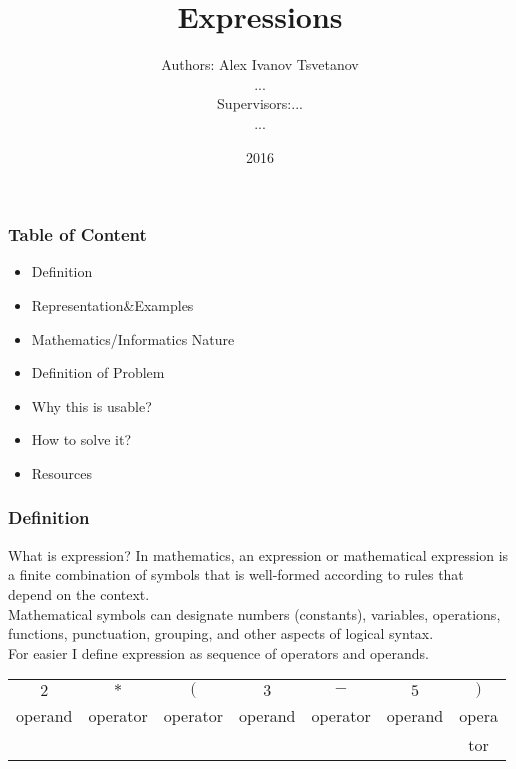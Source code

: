 \documentclass[12pt]{beamer}
\begin{document}
    \date {2016}
    \author[Alex, ...]{
        \begin{table}[]
        \begin{tabular}{rl}
        \normalsize{Authors:    } & \normalsize{Alex Ivanov Tsvetanov} \\
                                  & \normalsize{...                  } \\
        \scriptsize{Supervisors:} & \scriptsize{...                  } \\
                                  & \scriptsize{...                  }
        \end{tabular}
        \end{table}
	}
	\title[Expressions]{Expressions}
    \begin{frame}
        \titlepage
    \end{frame}
	\begin{frame}
	\frametitle{Table of Content}
		\begin{itemize}
			\item Definition
			\item Representation\&Examples
			\item Mathematics/Informatics Nature
			\item Definition of Problem
			\item Why this is usable?
			\item How to solve it?
			\item Resources
		\end{itemize}
	\end{frame}

	\begin{frame}
	\frametitle{Definition}
		\begin{block}{What is expression?}
			In mathematics, an expression or mathematical expression is a finite combination of symbols that is well-formed according to rules that depend on the context.\\
			Mathematical symbols can designate numbers (constants), variables, operations, functions, punctuation, grouping, and other aspects of logical syntax. \\ \vspace {0.5cm}
			{\Large For easier I define expression as sequence of operators and operands.}\\
		\end{block}
		{
			\normalsize
			
			\begin{table}[]
				\begin{tabular}{ccccccc}
					$2$ & $*$ & $($ & $3$ & $-$ & $5$ & $)$ \\
					operand & operator & operator & operand & operator & operand & opera \\
					& & & & & & tor \\
				\end{tabular}
			\end{table}
		}
	\end{frame}
	
\end{document}
